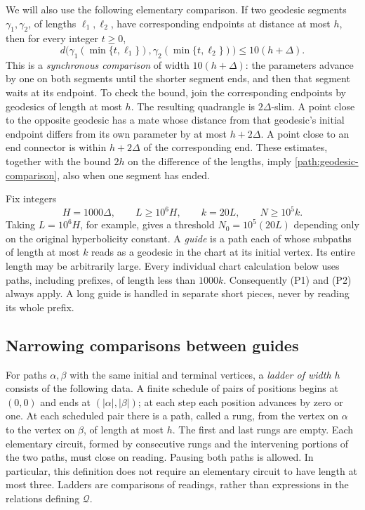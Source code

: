 We will also use the following elementary comparison.  If two geodesic
segments $\gamma_1,\gamma_2$, of lengths $\ell_1,\ell_2$, have
corresponding endpoints at distance at most $h$, then for every integer
$t\ge0$,
\begin{equation}\label{path:geodesic-comparison}
 d\bigl(\gamma_1(\min\{t,\ell_1\}),
        \gamma_2(\min\{t,\ell_2\})\bigr)\le10(h+\Delta).
\end{equation}
This is a \emph{synchronous comparison} of width $10(h+\Delta)$:
the parameters advance by one on both segments until the shorter
segment ends, and then that segment waits at its endpoint.
To check the bound, join the
corresponding endpoints by geodesics of length at most $h$.  The resulting
quadrangle is $2\Delta$-slim.  A point close to the opposite geodesic has
a mate whose distance from that geodesic's initial endpoint differs from
its own parameter by at most $h+2\Delta$.  A point close to an end
connector is within $h+2\Delta$ of the corresponding end.  These estimates,
together with the bound $2h$ on the difference of the lengths, imply
\eqref{path:geodesic-comparison}, also when one segment has ended.

Fix integers
\begin{equation}\label{path:constants}
 H=1000\Delta,\qquad L\ge10^6H,\qquad k=20L,
 \qquad N\ge10^5k.
\end{equation}
Taking $L=10^6H$, for example, gives a threshold $N_0=10^5(20L)$
depending only on the original hyperbolicity constant.
A \emph{guide} is a path each of whose subpaths of length at most $k$
reads as a geodesic in the chart at its initial vertex.  Its entire
length may be arbitrarily large.  Every individual chart calculation
below uses paths, including prefixes, of length less than $1000k$.
Consequently (P1) and (P2) always apply.  A long guide is handled in
separate short pieces, never by reading its whole prefix.

\subsection{Narrowing comparisons between guides}

For paths $\alpha,\beta$ with the same initial and terminal vertices, a
\emph{ladder of width $h$} consists of the following data.  A finite
schedule of pairs of positions begins at $(0,0)$ and ends at
$(|\alpha|,|\beta|)$; at each step each position advances by zero or one.
At each scheduled pair there is a path, called a rung, from the vertex
on $\alpha$ to the vertex on $\beta$, of length at most $h$.  The first
and last rungs are empty.  Each elementary circuit, formed by consecutive
rungs and the intervening portions of the two paths, must close on
reading.  Pausing both paths is allowed.  In particular, this definition
does not require an elementary circuit to have length at most three.
Ladders are comparisons of readings, rather than expressions in the
relations defining $\mathcal Q$.

